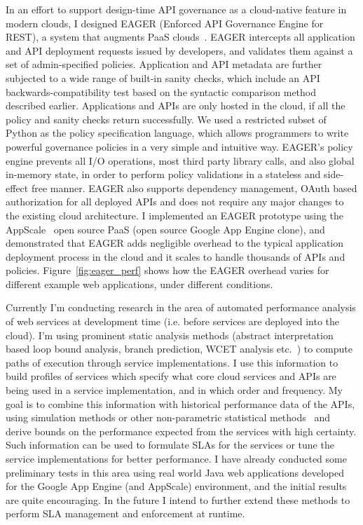 In an effort to support design-time API governance as a cloud-native feature in 
modern clouds, I designed EAGER (Enforced API Governance Engine for REST), a 
system that augments PaaS clouds~\cite{6903538}. EAGER intercepts all application and API 
deployment requests issued by developers, and validates them against a set of 
admin-specified policies. Application and API metadata are further subjected to a wide 
range of built-in sanity checks, which include an API backwards-compatibility test based 
on the syntactic comparison method described earlier. Applications and APIs are only 
hosted in the cloud, if all the policy and sanity checks return successfully. We used a 
restricted subset of Python as the policy specification language, which allows programmers 
to write powerful governance policies in a very simple and intuitive way. EAGER's policy engine 
prevents all I/O operations, most third party library calls, and also global in-memory state, in 
order to perform policy validations in a stateless and side-effect free manner. EAGER also 
supports dependency management, OAuth based authorization for all deployed APIs and does 
not require any major changes to the existing cloud architecture. I implemented an EAGER 
prototype using the AppScale~\cite{krintzappscale13} open source PaaS (open source Google App Engine clone), 
and demonstrated that EAGER adds negligible overhead to the typical application deployment 
process in the cloud and it scales to handle thousands of APIs and policies. Figure~\ref{fig:eager_perf}
shows how the EAGER overhead varies for different example web applications, under different
conditions.

Currently I'm conducting research in the area of automated performance analysis of web
services at development time (i.e. before services are deployed into the cloud). I'm using
prominent static analysis methods (abstract interpretation based loop bound analysis,
branch prediction, WCET analysis etc.~\cite{ermedahl_et_al:OASIcs:2007:1194,Yeh:1991:TAT:123465.123475,bygde2010static}) 
to compute paths of execution through service 
implementations. I use this information to build profiles of services which
specify what core cloud services and APIs are being used in a service implementation,
and in which order and frequency. My goal is to combine this information with historical
performance data of the APIs, using simulation methods or other non-parametric statistical
methods~\cite{Nurmi:2007:QQB:1791551.1791556} and derive bounds on the performance expected from the services with high
certainty. 
Such information can be used to formulate SLAs for the services or tune
the service implementations for better performance. 
I have already conducted some preliminary tests in this area using real world
Java web applications developed for the Google App Engine (and AppScale) environment,
and the initial results are quite encouraging.
In the future I intend to further extend 
these methods to perform SLA management and enforcement at runtime.